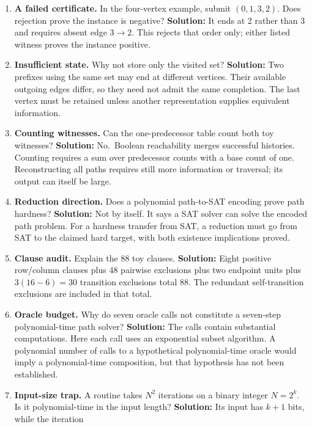\begin{enumerate}
\def\labelenumi{\arabic{enumi}.}
\item
  \textbf{A failed certificate.} In the four-vertex example, submit
  \((0,1,3,2)\). Does rejection prove the instance is negative?
  \textbf{Solution:} It ends at 2 rather than 3 and requires absent edge
  \(3\to2\). This rejects that order only; either listed witness proves
  the instance positive.
\item
  \textbf{Insufficient state.} Why not store only the visited set?
  \textbf{Solution:} Two prefixes using the same set may end at
  different vertices. Their available outgoing edges differ, so they
  need not admit the same completion. The last vertex must be retained
  unless another representation supplies equivalent information.
\item
  \textbf{Counting witnesses.} Can the one-predecessor table count both
  toy witnesses? \textbf{Solution:} No.~Boolean reachability merges
  successful histories. Counting requires a sum over predecessor counts
  with a base count of one. Reconstructing all paths requires still more
  information or traversal; its output can itself be large.
\item
  \textbf{Reduction direction.} Does a polynomial path-to-SAT encoding
  prove path hardness? \textbf{Solution:} Not by itself. It says a SAT
  solver can solve the encoded path problem. For a hardness transfer
  from SAT, a reduction must go from SAT to the claimed hard target,
  with both existence implications proved.
\item
  \textbf{Clause audit.} Explain the 88 toy clauses. \textbf{Solution:}
  Eight positive row/column clauses plus 48 pairwise exclusions plus two
  endpoint units plus \(3(16-6)=30\) transition exclusions total 88. The
  redundant self-transition exclusions are included in that total.
\item
  \textbf{Oracle budget.} Why do seven oracle calls not constitute a
  seven-step polynomial-time path solver? \textbf{Solution:} The calls
  contain substantial computations. Here each call uses an exponential
  subset algorithm. A polynomial number of calls to a hypothetical
  polynomial-time oracle would imply a polynomial-time composition, but
  that hypothesis has not been established.
\item
  \textbf{Input-size trap.} A routine takes \(N^2\) iterations on a
  binary integer \(N=2^k\). Is it polynomial-time in the input length?
  \textbf{Solution:} Its input has \(k+1\) bits, while the iteration

\end{enumerate}
